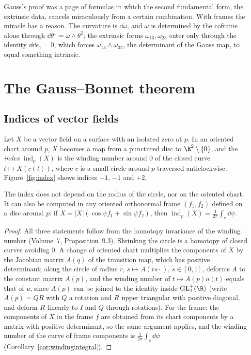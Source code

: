 \begin{beauty}
Gauss's proof was a page of formulas in which the second fundamental form, the extrinsic data, cancels miraculously from a certain combination. With
frames the miracle has a reason. The curvature is $\dd\omega$, and $\omega$ is determined by the coframe alone through $\dd\theta^1=\omega\wedge\theta^2$; the extrinsic forms
$\omega_{13},\omega_{23}$ enter only through the identity $\dd\dd e_1=0$, which forces $\omega_{13}\wedge\omega_{32}$, the determinant of the Gauss map, to equal something intrinsic.
\end{beauty}

\section{The Gauss--Bonnet theorem}

\subsection*{Indices of vector fields}

Let $X$ be a vector field on a surface with an isolated zero at $p$. In an oriented chart around $p$, $X$ becomes a map from a punctured disc to $\R^2\setminus\{0\}$, and the
\emph{index} $\operatorname{ind}_p(X)$ is the winding number around $0$ of the closed curve $t\mapsto X(c(t))$, where $c$ is a small circle around $p$ traversed anticlockwise.
Figure~\ref{fig:index} shows indices $+1$, $-1$ and $+2$.

\begin{lemma}\label{lem:index}
The index does not depend on the radius of the circle, nor on the oriented chart. It can also be computed in any oriented orthonormal frame $(f_1,f_2)$
defined on a disc around $p$: if $X=|X|(\cos\psi f_1+\sin\psi f_2)$, then $\operatorname{ind}_p(X)=\frac1{2\pi}\int_c\dd\psi$.
\end{lemma}
\begin{proof}
All three statements follow from the homotopy invariance of the winding number (Volume~7, Proposition~9.3). Shrinking the circle is a homotopy of closed curves
avoiding $0$. A change of oriented chart multiplies the components of $X$ by the Jacobian matrix $A(q)$ of the transition map, which has positive determinant;
along the circle of radius $r$, $s\mapsto A(rs\cdot)$, $s\in[0,1]$, deforms $A$ to the constant matrix $A(p)$, and the winding number of $t\mapsto A(p)u(t)$ equals that
of $u$, since $A(p)$ can be joined to the identity inside $\mathrm{GL}_2^+(\R)$ (write $A(p)=QR$ with $Q$ a rotation and $R$ upper triangular with positive diagonal, and
deform $R$ linearly to $I$ and $Q$ through rotations). For the frame: the components of $X$ in the frame $f$ are obtained from its chart components by a matrix
with positive determinant, so the same argument applies, and the winding number of the curve of frame components is $\frac1{2\pi}\int_c\dd\psi$ (Corollary~\ref{cor:windingintegral}).
\end{proof}

